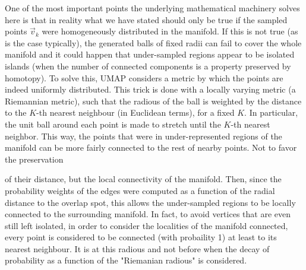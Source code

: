 \documentclass[11pt, a4paper, twoside]{article} %
\DeclareRobustCommand{\mybox}[2][gray!10]{%
\begin{tcolorbox}[   %
        left=0.2cm,
        right=0.2cm,
        top=0.15cm,
        bottom=0.15cm,
        colback=#1,
        colframe=#1,
        width=\dimexpr\textwidth\relax, 
        enlarge left by=0mm,
        boxsep=5pt,
        arc=0pt,outer arc=0pt,
        ]
        #2
\end{tcolorbox}
}
\begin{document}
{One of the most important points the underlying mathematical machinery solves here is that in reality what we have stated should only be true if the sampled points $\vec{v}_k$ were homogeneously distributed in the manifold. If this is not true (as is the case typically), the generated balls of fixed radii can fail to cover the whole manifold and it could happen that under-sampled regions appear to be isolated islands (when the number of connected components is a property preserved by homotopy). To solve this, UMAP considers a metric by which the points are indeed uniformly distributed. This trick is done with a locally varying metric (a Riemannian metric), such that the radious of the ball is weighted by the distance to the $K$-th nearest neighbour (in Euclidean terms), for a fixed $K$. In particular, the unit ball around each point is made to stretch until the $K$-th nearest neighbor. This way, the points that were in under-represented regions of the manifold can be more fairly connected to the rest of nearby points. Not to favor the preservation}\mybox{ of their distance, but the local connectivity of the manifold. Then, since the probability weights of the edges were computed as a function of the radial distance to the overlap spot, this allows the under-sampled regions to be locally connected to the surrounding manifold. In fact, to avoid vertices that are even still left isolated, in order to consider the localities of the manifold connected, every point is considered to be connected (with probaility 1) at least to its nearest neighbour. It is at this radious and not before when the decay of probability as a function of the "Riemanian radious" is considered.\vspace{0.2cm} %

}
\end{document}
